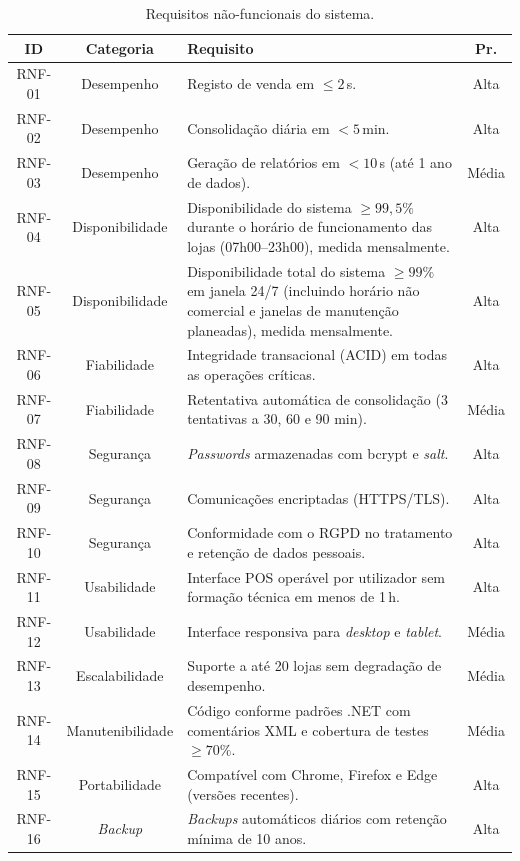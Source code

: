     \begin{table}[H]
    \centering
    \small
    \begin{tabular}{|c|c|p{8.5cm}|c|}
    \hline
    \textbf{ID} & \textbf{Categoria} & \textbf{Requisito} & \textbf{Pr.} \\
    \hline
    RNF-01 & Desempenho & Registo de venda em $\leq 2$\,s. & Alta \\
    \hline
    RNF-02 & Desempenho & Consolidação diária em $< 5$\,min. & Alta \\
    \hline
    RNF-03 & Desempenho & Geração de relatórios em $< 10$\,s (até 1 ano de dados). & Média \\
    \hline
    RNF-04 & Disponibilidade & Disponibilidade do sistema $\geq 99{,}5\%$ durante o horário de funcionamento das lojas (07h00--23h00), medida mensalmente. & Alta \\
    \hline
    RNF-05 & Disponibilidade & Disponibilidade total do sistema $\geq 99\%$ em janela 24/7 (incluindo horário não comercial e janelas de manutenção planeadas), medida mensalmente. & Alta \\
    \hline
    RNF-06 & Fiabilidade & Integridade transacional (ACID) em todas as operações críticas. & Alta \\
    \hline
    RNF-07 & Fiabilidade & Retentativa automática de consolidação (3 tentativas a 30, 60 e 90 min). & Média \\
    \hline
    RNF-08 & Segurança & \textit{Passwords} armazenadas com bcrypt e \textit{salt}. & Alta \\
    \hline
    RNF-09 & Segurança & Comunicações encriptadas (HTTPS/TLS). & Alta \\
    \hline
    RNF-10 & Segurança & Conformidade com o RGPD no tratamento e retenção de dados pessoais. & Alta \\
    \hline
    RNF-11 & Usabilidade & Interface POS operável por utilizador sem formação técnica em menos de 1\,h. & Alta \\
    \hline
    RNF-12 & Usabilidade & Interface responsiva para \textit{desktop} e \textit{tablet}. & Média \\
    \hline
    RNF-13 & Escalabilidade & Suporte a até 20 lojas sem degradação de desempenho. & Média \\
    \hline
    RNF-14 & Manutenibilidade & Código conforme padrões .NET com comentários XML e cobertura de testes $\geq 70\%$. & Média \\
    \hline
    RNF-15 & Portabilidade & Compatível com Chrome, Firefox e Edge (versões recentes). & Alta \\
    \hline
    RNF-16 & \textit{Backup} & \textit{Backups} automáticos diários com retenção mínima de 10 anos. & Alta \\
    \hline
    \end{tabular}
    \caption{Requisitos não-funcionais do sistema.}
    \label{tab:rnf}
    \end{table}

